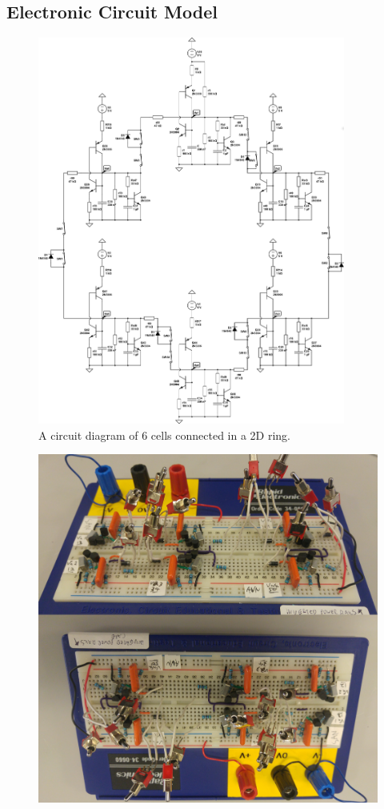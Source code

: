\subsection{Electronic Circuit Model}
\label{appendixcircuit}
\begin{figure}[H]
    \centering
    \includegraphics[width=0.9\textwidth]{images/full-circuit.png}
    \caption{A circuit diagram of 6 cells connected in a 2D ring.}
    \label{fig3.6}
\end{figure}
\begin{figure}[H]
    \centering
    \includegraphics[width=\textwidth]{images/circuitappendix.png}
\end{figure}

